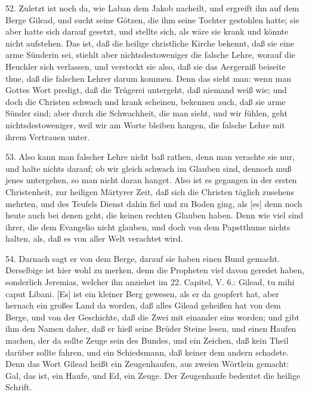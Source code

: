 52. Zuletzt ist noch da, wie Laban dem Jakob nacheilt, und ergreift ihn auf dem Berge Gilead, und sucht seine Götzen, die ihm seine Tochter gestohlen hatte; sie aber hatte sich darauf gesetzt, und stellte sich, als wäre sie krank und könnte nicht aufstehen. Das ist, daß die heilige christliche Kirche bekennt, daß sie eine arme Sünderin sei, stiehlt aber nichtsdestoweniger die falsche Lehre, worauf die Heuchler sich verlassen, und versteckt sie also, daß sie das Aergerniß beiseite thue, daß die falschen Lehrer darum kommen. Denn das sieht man: wenn man Gottes Wort predigt, daß die Trügerei untergeht, daß niemand weiß wie; und doch die Christen schwach und krank scheinen, bekennen auch, daß sie arme Sünder sind; aber durch die Schwachheit, die man sieht, und wir fühlen, geht nichtsdestoweniger, weil wir am Worte bleiben hangen, die falsche Lehre mit ihrem Vertrauen unter.

53. Also kann man falscher Lehre nicht baß rathen, denn man verachte sie nur, und halte nichts darauf; ob wir gleich schwach im Glauben sind, dennoch muß jenes untergehen, so man nicht daran hanget. Also ist es gegangen in der ersten Christenheit, zur heiligen Märtyrer Zeit, daß sich die Christen täglich zusehens mehrten, und des Teufels Dienst dahin fiel und zu Boden ging, als [es] denn noch heute auch bei denen geht, die keinen rechten Glauben haben. Denn wie viel sind ihrer, die dem Evangelio nicht glauben, und doch von dem Papstthume nichts halten, als, daß es von aller Welt verachtet wird.

54. Darnach sagt er von dem Berge, darauf sie haben einen Bund gemacht. Derselbige ist hier wohl zu merken, denn die Propheten viel davon geredet haben, sonderlich Jeremias, welcher ihn anziehet im 22. Capitel, V. 6.: Gilead, tu mihi caput Libani. [Es] ist ein kleiner Berg gewesen, als er da geopfert hat, aber hernach ein großes Land da worden, daß alles Gilead geheißen hat von dem Berge, und von der Geschichte, daß die Zwei mit einander eins worden; und gibt ihm den Namen daher, daß er hieß seine Brüder Steine lesen, und einen Haufen machen, der da sollte Zeuge sein des Bundes, und ein Zeichen, daß kein Theil darüber sollte fahren, und ein Schiedsmann, daß keiner dem andern schadete. Denn das Wort Gilead heißt ein Zeugenhaufen, aus zweien Wörtlein gemacht: Gal, das ist, ein Haufe, und Ed, ein Zeuge. Der Zeugenhaufe bedeutet die heilige Schrift.

